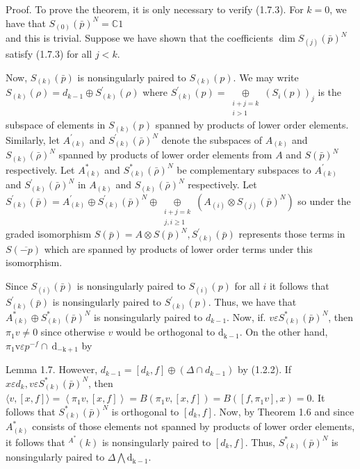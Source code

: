 \documentclass[10pt]{article}
\begin{document}
Proof. To prove the theorem, it is only necessary to verify (1.7.3). For $k=0$, we have that $S_{(0)}(\bar{p})^{N}=\mathbb{C} 1$\\
and this is trivial. Suppose we have shown that the coefficients $\operatorname{dim} S_{(j)}(\bar{p})^{N}$ satisfy (1.7.3) for all $j<k$.

Now, $S_{(k)}(\bar{p})$ is nonsingularly paired to $S_{(k)}(p)$. We may write $S_{(k)}(\rho)=d_{k-1} \oplus S_{(k)}^{\prime}(\rho)$ where $S_{(k)}^{\prime}(p)=\underset{\substack{i+j=k \\ i>1}}{\oplus}\left(S_{i}(p)\right)_{j}$ is the subspace of elements in $S_{(k)}(p)$ spanned by products of lower order elements. Similarly, let $A_{(k)}^{\prime}$ and $S_{(k)}^{\prime}(\bar{\rho})^{N}$ denote the subspaces of $A_{(k)}$ and $S_{(k)}(\bar{\rho})^{N}$ spanned by products of lower order elements from $A$ and $S(\bar{p})^{N}$ respectively. Let $A_{(k)}^{*}$ and $S_{(k)}^{*}(\bar{\rho})^{N}$ be complementary subspaces to $A_{(k)}^{\prime}$ and $S_{(k)}^{\prime}(\bar{\rho})^{N}$ in $A_{(k)}$ and $S_{(k)}(\bar{\rho})^{N}$ respectively. Let $S_{(k)}^{\prime}(\bar{p})=A_{(k)}^{\prime} \oplus S_{(k)}^{\prime}(\bar{p})^{N} \oplus \underset{\substack{i+j=k \\ j, i \geq 1}}{\oplus}\left(A_{(i)} \otimes S_{(j)}(\bar{p})^{N}\right)$ so under the graded isomorphism $S(\bar{p})=A \otimes S(\bar{p})^{N}, S_{(k)}^{\prime}(\bar{p})$ represents those terms in $S(\overline{-p})$ which are spanned by products of lower order terms under this isomorphism.

Since $S_{(i)}(\bar{p})$ is nonsingularly paired to $S_{(i)}(p)$ for all $i$ it follows that $S_{(k)}^{\prime}(\bar{p})$ is nonsingularly paired to $S_{(k)}^{\prime}(p)$. Thus, we have that $A_{(k)}^{*} \oplus S_{(k)}^{*}(\bar{p})^{N}$ is nonsingularly paired to $d_{k-1}$. Now, if. $v \varepsilon S_{(k)}^{*}(\bar{p})^{N}$, then $\pi_{1} v \neq 0$ since otherwise $v$ would be orthogonal to $\mathrm{d}_{\mathrm{k}-1}$. On the other hand, $\pi_{1} \mathrm{v} \varepsilon p^{-f} \cap \mathrm{~d}_{-\mathrm{k}+1}$ by

Lemma 1.7. However, $d_{k-1}=\left[d_{k}, f\right] \oplus\left(\Delta \cap d_{k-1}\right)$ by (1.2.2). If $x \varepsilon d_{k}, v \varepsilon S_{(k)}^{*}(\bar{p})^{N}$, then $\langle v,[x, f]\rangle=\left\langle\pi_{1} v,[x, f]\right\rangle =B\left(\pi_{1} v,[x, f]\right)=B\left(\left[f, \pi_{1} v\right], x\right)=0$. It follows that $S_{(k)}^{*}(\bar{p})^{N}$ is orthogonal to $\left[d_{k}, f\right]$. Now, by Theorem 1.6 and since $A_{(k)}^{*}$ consists of those elements not spanned by products of lower order elements, it follows that ${ }^{A^{*}}(k)$ is nonsingularly paired to $\left[d_{k}, f\right]$. Thus, $S_{(k)}^{*}(\bar{p})^{N}$ is nonsingularly paired to $\Delta \bigwedge \mathrm{d}_{\mathrm{k}-1}$.
\end{document}
